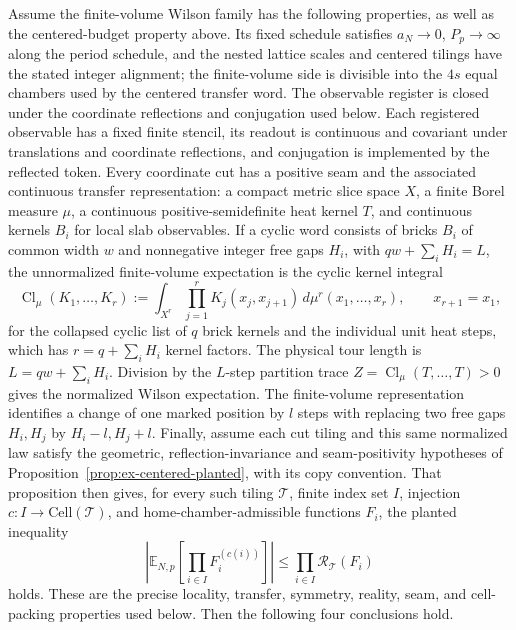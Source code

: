 \begin{theorem}\label{ex-centered-producers}
Assume the finite-volume Wilson family has the following properties, as well as the centered-budget property above. Its fixed schedule satisfies $a_N\to0$, $P_p\to\infty$ along the period schedule, and the nested lattice scales and centered tilings have the stated integer alignment; the finite-volume side is divisible into the $4s$ equal chambers used by the centered transfer word. The observable register is closed under the coordinate reflections and conjugation used below. Each registered observable has a fixed finite stencil, its readout is continuous and covariant under translations and coordinate reflections, and conjugation is implemented by the reflected token. Every coordinate cut has a positive seam and the associated continuous transfer representation: a compact metric slice space $X$, a finite Borel measure $\mu$, a continuous positive-semidefinite heat kernel $T$, and continuous kernels $B_i$ for local slab observables. If a cyclic word consists of bricks $B_i$ of common width $w$ and nonnegative integer free gaps $H_i$, with $qw+\sum_iH_i=L$, the unnormalized finite-volume expectation is the cyclic kernel integral
\[
 \operatorname{Cl}_\mu(K_1,\ldots,K_r)
 :=\int_{X^r}\prod_{j=1}^{r}K_j(x_j,x_{j+1})\,d\mu^r(x_1,\ldots,x_r),\qquad x_{r+1}=x_1,
\]
for the collapsed cyclic list of $q$ brick kernels and the individual unit heat steps, which has $r=q+\sum_i H_i$ kernel factors. The physical tour length is $L=qw+\sum_iH_i$. Division by the $L$-step partition trace $Z=\operatorname{Cl}_\mu(T,\ldots,T)>0$ gives the normalized Wilson expectation. The finite-volume representation identifies a change of one marked position by $l$ steps with replacing two free gaps $H_i,H_j$ by $H_i-l,H_j+l$. Finally, assume each cut tiling and this same normalized law satisfy the geometric, reflection-invariance and seam-positivity hypotheses of Proposition~\ref{prop:ex-centered-planted}, with its copy convention. That proposition then gives, for every such tiling $\mathcal T$, finite index set $I$, injection $c:I\to\mathrm{Cell}(\mathcal T)$, and home-chamber-admissible functions $F_i$, the planted inequality
\[
 \left|\mathbb E_{N,p}\!\left[\prod_{i\in I} F_i^{(c(i))}\right]\right|
 \leq \prod_{i\in I} \mathcal R_{\mathcal T}(F_i)
\]
holds. These are the precise locality, transfer, symmetry, reality, seam, and cell-packing properties used below. Then the following four conclusions hold.
\begin{enumerate}

\end{enumerate}
\end{theorem}
